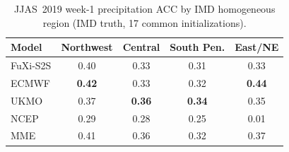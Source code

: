 \begin{table}[t]
  \centering
  \caption{JJAS~2019 week-1 precipitation ACC by IMD homogeneous region (IMD truth, 17 common initializations).}
  \label{tab:reg_jjas_tp_w1}
  \small
  \begin{tabular}{lcccc}
    \toprule
    Model & Northwest & Central & South Pen. & East/NE \\
    \midrule
    FuXi-S2S       & 0.40 & 0.33 & 0.31 & 0.33 \\
ECMWF          & \textbf{0.42} & 0.33 & 0.32 & \textbf{0.44} \\
UKMO           & 0.37 & \textbf{0.36} & \textbf{0.34} & 0.35 \\
NCEP           & 0.29 & 0.28 & 0.25 & 0.01 \\
MME            & 0.41 & 0.36 & 0.32 & 0.37 \\
    \bottomrule
  \end{tabular}
\end{table}
